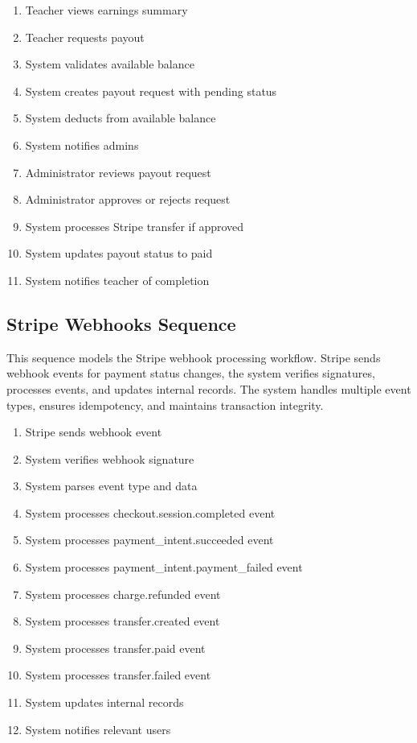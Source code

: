 \begin{enumerate}[topsep=0pt,itemsep=1pt,parsep=0pt,partopsep=0pt]
    \item Teacher views earnings summary
    \item Teacher requests payout
    \item System validates available balance
    \item System creates payout request with pending status
    \item System deducts from available balance
    \item System notifies admins
    \item Administrator reviews payout request
    \item Administrator approves or rejects request
    \item System processes Stripe transfer if approved
    \item System updates payout status to paid
    \item System notifies teacher of completion
\end{enumerate}


\subsection{Stripe Webhooks Sequence}
This sequence models the Stripe webhook processing workflow. Stripe sends
webhook events for payment status changes, the system verifies signatures,
processes events, and updates internal records. The system handles multiple
event types, ensures idempotency, and maintains transaction integrity.

\begin{enumerate}[topsep=0pt,itemsep=1pt,parsep=0pt,partopsep=0pt]
    \item Stripe sends webhook event
    \item System verifies webhook signature
    \item System parses event type and data
    \item System processes checkout.session.completed event
    \item System processes payment\_intent.succeeded event
    \item System processes payment\_intent.payment\_failed event
    \item System processes charge.refunded event
    \item System processes transfer.created event
    \item System processes transfer.paid event
    \item System processes transfer.failed event
    \item System updates internal records
    \item System notifies relevant users
\end{enumerate}

